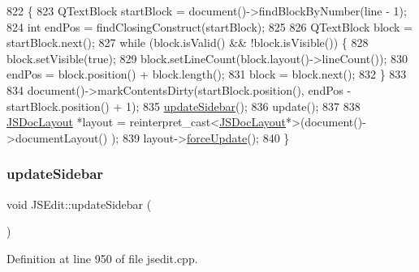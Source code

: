 \begin{DoxyCode}
822 \{
823     QTextBlock startBlock = document()->findBlockByNumber(line - 1);
824     \textcolor{keywordtype}{int} endPos = findClosingConstruct(startBlock);
825 
826     QTextBlock block = startBlock.next();
827     \textcolor{keywordflow}{while} (block.isValid() && !block.isVisible()) \{
828         block.setVisible(\textcolor{keyword}{true});
829         block.setLineCount(block.layout()->lineCount());
830         endPos = block.position() + block.length();
831         block = block.next();
832     \}
833 
834     document()->markContentsDirty(startBlock.position(), endPos - startBlock.position() + 1);
835     \hyperlink{class_j_s_edit_ac51a3a9f7b1e8c5bc98b345bfc3d3b53}{updateSidebar}();
836     update();
837 
838     \hyperlink{class_j_s_doc_layout}{JSDocLayout} *layout = \textcolor{keyword}{reinterpret\_cast<}\hyperlink{class_j_s_doc_layout}{JSDocLayout}*\textcolor{keyword}{>}(document()->documentLayout()
      );
839     layout->\hyperlink{class_j_s_doc_layout_a181d392df06a4e6fca1f38b3a5a86a2c}{forceUpdate}();
840 \}
\end{DoxyCode}
\mbox{\label{class_j_s_edit_ac51a3a9f7b1e8c5bc98b345bfc3d3b53}} 
\subsubsection{\texorpdfstring{update\+Sidebar}{updateSidebar}}
{\footnotesize\ttfamily void J\+S\+Edit\+::update\+Sidebar (\begin{DoxyParamCaption}{ }\end{DoxyParamCaption})\hspace{0.3cm}{\ttfamily [slot]}}



Definition at line 950 of file jsedit.\+cpp.


